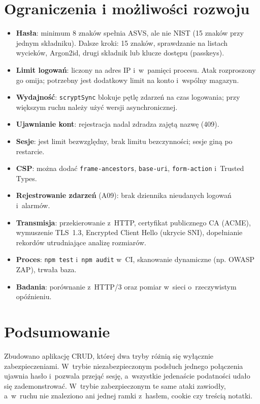 \documentclass[12pt,a4paper]{article}
\newcommand{\kod}[1]{\texttt{#1}}
\begin{document}
\section{Ograniczenia i możliwości rozwoju}
\begin{itemize}
\item \textbf{Hasła}: minimum 8 znaków spełnia ASVS, ale nie NIST (15 znaków przy jednym składniku). Dalsze kroki: 15 znaków, sprawdzanie na listach wycieków, Argon2id, drugi składnik lub klucze dostępu (passkeys).
\item \textbf{Limit logowań}: liczony na adres IP i~w~pamięci procesu. Atak rozproszony go omija; potrzebny jest dodatkowy limit na konto i~wspólny magazyn.
\item \textbf{Wydajność}: \kod{scryptSync} blokuje pętlę zdarzeń na czas logowania; przy większym ruchu należy użyć wersji asynchronicznej.
\item \textbf{Ujawnianie kont}: rejestracja nadal zdradza zajętą nazwę (409).
\item \textbf{Sesje}: jest limit bezwzględny, brak limitu bezczynności; sesje giną po restarcie.
\item \textbf{CSP}: można dodać \kod{frame-ancestors}, \kod{base-uri}, \kod{form-action} i~Trusted Types.
\item \textbf{Rejestrowanie zdarzeń} (A09): brak dziennika nieudanych logowań i~alarmów.
\item \textbf{Transmisja}: przekierowanie z~HTTP, certyfikat publicznego CA (ACME), wymuszenie TLS~1.3, Encrypted Client Hello (ukrycie SNI), dopełnianie rekordów utrudniające analizę rozmiarów.
\item \textbf{Proces}: \kod{npm test} i~\kod{npm audit} w~CI, skanowanie dynamiczne (np. OWASP ZAP), trwała baza.
\item \textbf{Badania}: porównanie z~HTTP/3 oraz pomiar w~sieci o~rzeczywistym opóźnieniu.
\end{itemize}

\section{Podsumowanie}
Zbudowano aplikację CRUD, której dwa tryby różnią się wyłącznie zabezpieczeniami. W~trybie niezabezpieczonym podsłuch jednego połączenia ujawnia hasło i~pozwala przejąć sesję, a~wszystkie jedenaście podatności udało się zademonstrować. W~trybie zabezpieczonym te same ataki zawiodły, a~w~ruchu nie znaleziono ani jednej ramki z~hasłem, cookie czy treścią notatki.
\end{document}

